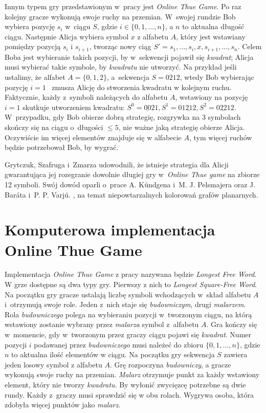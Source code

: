 \documentclass[document]{xmgr}
\begin{document}
Innym typem gry przedstawionym w~pracy \cite{thueonline} jest \emph{Online Thue Game}. Po raz kolejny gracze wykonują swoje ruchy na przemian. W~swojej rundzie Bob wybiera pozycję $s_i$ w~ciągu $S$, gdzie $i \in \{0, 1,\ldots , n\}$, a $n$ to aktualna długość ciągu. Następnie Alicja wybiera symbol $x$ z alfabetu $A$, który jest wstawiany pomiędzy pozycją $s_{i}$ i $s_{i+1}$, tworząc nowy ciąg $S'=s_1, \ldots, s_i, x, s_{i+1}, \ldots, s_n$. Celem Boba jest wybieranie takich pozycji, by w~sekwencji pojawił się \emph{kwadrat}; Alicja musi wybierać takie symbole, by \emph{kwadratu} nie utworzyć. Na przykład jeśli ustalimy, że alfabet $A = \{0, 1, 2\}$, a~sekwencja $S=0212$, wtedy Bob wybierając pozycję $i=1$ ~zmusza Alicję do stworzenia kwadratu w kolejnym ruchu. Faktycznie, każdy z~symboli należących do alfabetu $A$, wstawiony na pozycję $i=1$ skutkuje utworzeniem kwadratu: $S^0 = \underline{00}21, S^1=0\underline{1212}, S^2=0\underline{22}12$. W~przypadku, gdy Bob obierze dobrą strategię, rozgrywka na $3$ symbolach skończy się na ciągu o~długości $\leq 5$, nie ważne jaką strategię obierze Alicja. Oczywiście im więcej elementów znajduje się w alfabecie $A$, tym więcej ruchów będzie potrzebował Bob, by wygrać.

Grytczuk, Szafruga i~Zmarza \cite{thueonline} udowodnili, że istnieje strategia dla Alicji gwarantująca jej rozegranie dowolnie długiej gry w~\emph{Online Thue game} na zbiorze 12 symboli. Swój dowód oparli o~prace A. Kündgena i~M. J. Pelsmajera \cite{first} oraz J. Baráta i~P. P. Varjú. \cite{second}, na temat niepowtarzalnych kolorowań grafów planarnych. 

\section{Komputerowa implementacja Online Thue Game}
Implementacja \emph{Online Thue Game} z pracy \cite{thueonline}  nazywana będzie \emph{Longest Free Word}. W grze dostępne są dwa typy gry. Pierwszy z nich to \emph{Longest Square-Free Word}. Na początku gry gracze ustalają liczbę symboli wchodzących w~skład alfabetu $A$ i~otrzymują swoje role. Jeden z~nich staje się \emph{budowniczym}, drugi \emph{malarzem}. Rola \emph{budowniczego} polega na wybieraniu pozycji w~tworzonym ciągu, na którą wstawiony zostanie wybrany przez \emph{malarza} symbol z~alfabetu $A$. Gra kończy się w~momencie, gdy w~tworzonym przez graczy ciągu pojawi się \emph{kwadrat}. Numer pozycji $i$ podawanej przez \emph{budowniczego} musi należeć do zbioru $\{0, 1, \ldots, n\}$, gdzie $n$ to aktualna ilość elementów w ciągu. Na początku gry sekwencja $S$ zawiera jeden losowy symbol z alfabetu $A$. Grę rozpoczyna \emph{budowniczy}, a gracze wykonują swoje ruchy na przemian. \emph{Malarz} otrzymuje punkt za każdy wstawiony element, który nie tworzy \emph{kwadratu}. By wyłonić zwycięzcę potrzebne są dwie rundy. Każdy z~graczy musi sprawdzić się w obu rolach. Wygrywa osoba, która zdobyła więcej punktów jako \emph{malarz}.
\end{document}
